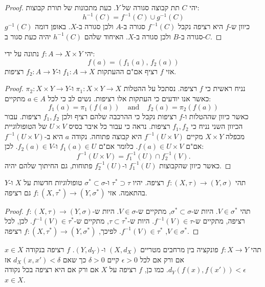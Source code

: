 \documentclass{tstextbook}
\begin{document}
\begin{proof}
יהי \(C\) תת קבוצה סגורה של \(Y\). כעת מתכונות של תורת קבוצות:
$$h^{-1}(C)=f^{-1}(C)\cup g^{-1}(C)$$
כיוון ש-\(f\) היא רציפה נקבל \(f^{-1}(C)\) סגורה ב-\(A\) ולכן סגורה ב-\(X\). באופן דומה \(g^{-1}(C)\) סגורה ב-\(B\) ולכן סגורה ב-\(X\). האיחוד שלהם \(h^{-1}(C)\) יהיה כעת סגור ב-\(C\).

\end{proof}
\begin{proposition}
יהי \(f:A\to X\times Y\) נתונה על ידי:
$$f(a)=(f_{1}(a),\,f_{2}(a))$$
אזי \(f\) רציף אם"ם ההעתקות \(f_{1}:A\to X\) ו-\(f_{2}:A\to Y\) רציפות.

\end{proposition}
\begin{proof}
נניח ראשית כי \(f\) רציפה. נסתכל על ההטלות \(\pi_{1}:X\times Y\to X\) ו-\(\pi_{2}:X\times Y\to Y\) כאשר אנו יודעים כי העתקות אלו רציפות. נשים לב כי לכל \(a \in A\) מתקיים:
$$f_{1}(a)=\pi_{1}(f(a))\ \ \ \ \ \mathrm{and}\ \ \ \ \ f_{2}(a)=\pi_{2}(f(a))$$
כאשר כיוון שההטלות ו-\(f\) רציפות נקבל כי ההרכבה שלהם רציף ולכן \(f_{1},f_{2}\) רציפות.
עבור הכיוון השני נניח כי \(f_{1},f_{2}\) רציפות. נראה כי עבור כל איבר בסיס \(U\times V\) של הטופולוגיית מכפלה \(X \times Y\) מקיים \(f^{-1}(U\times V)\) היא קבוצה פתוחה. נקודה \(a\) היא ב-\(f^{-1}(U\times V)\) אם"ם \(f(a)\in U \times V\). כלומר אם"ם \(f_{1}(a) \in U\) ו-\(f_{2}(a)\in V\). לכן:
$$f^{-1}(U\times V)=f_{1}^{-1}(U)\cap f_{2}^{-1}(V).$$
כאשר כיוון שהקבוצות \(f_{1}^{-1}(U)\) ו-\(f_{2}^{-1}(U)\) פתוחות, גם החיתוך שלהם יהיה.

\end{proof}
\begin{proposition}
תהי \(f: (X, \tau) \to (Y, \sigma)\) רציפה. יהיו \(\tau^* \supset \tau\) ו-\(\sigma^* \subset \sigma\) טופולוגיות חדשות על \(X\) ו-\(Y\) בהתאמה. אזי \(f: (X, \tau^*) \to (Y, \sigma^*)\) גם רציפה.

\end{proposition}
\begin{proof}
תהי \(V \in \sigma^*\). היות ש-\(\sigma^* \subset \sigma\), מתקיים ש-\(V \in \sigma\). היות ש-\(f: (X, \tau) \to (Y, \sigma)\) רציפה, מתקיים ש-\(f^{-1}(V) \in \tau\). היות ש-\(\tau \subset \tau^*\), מתקיים ש-\(f^{-1}(V) \in \tau^*\). לכן, לכל \(V \in \sigma^*\), \(f^{-1}(V) \in \tau^*\). לפיכך, \(f: (X, \tau^*) \to (Y, \sigma^*)\) רציפה.

\end{proof}
\begin{proposition}
תהי \(f: X \to Y\) פונקציה בין מרחבים מטריים \((X, d_X)\) ו-\((Y, d_Y)\). \(f\) רציפה בנקודה \(x \in X\) אם ורק אם לכל \(\epsilon > 0\) קיים \(\delta > 0\) כך שאם \(d_X(x, x') < \delta\) אז \(d_Y(f(x), f(x')) < \epsilon\). כמו כן, \(f\) רציפה על \(X\) אם ורק אם היא רציפה בכל נקודה \(x \in X\).

\end{proposition}
\end{document}
